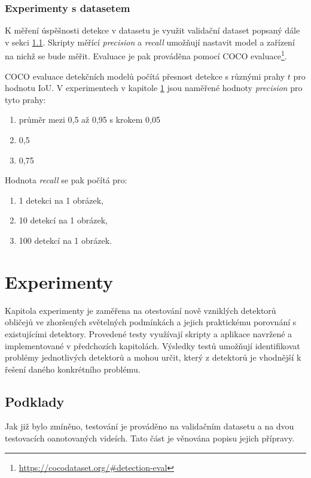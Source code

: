 \subsection*{Experimenty s datasetem}
K měření úspěšnosti detekce v datasetu je využit validační dataset popsaný dále v sekci \ref{sekce:podklady}. Skripty měřící \emph{precision} a \emph{recall} umožňují nastavit model a zařízení na nichž se bude měřit. Evaluace je pak prováděna pomocí COCO evaluace\footnote{\url{https://cocodataset.org/\#detection-eval}}. 

COCO evaluace detekčních modelů počítá přesnost detekce s různými prahy $t$ pro hodnotu IoU. V experimentech v kapitole \ref{kapitola:experimenty} jsou naměřené hodnoty \emph{precision} pro tyto prahy:

\begin{enumerate}
  \item průměr mezi 0,5 až 0,95 s krokem 0,05
  \item 0,5
  \item 0,75
\end{enumerate}

\noindent Hodnota \emph{recall} se pak počítá pro:

\begin{enumerate}
  \item 1 detekci na 1 obrázek,
  \item 10 detekcí na 1 obrázek,
  \item 100 detekcí na 1 obrázek.
\end{enumerate}
 

\chapter{Experimenty}
\label{kapitola:experimenty}
Kapitola experimenty je zaměřena na otestování nově vzniklých detektorů obličejů ve zhoršených světelných podmínkách a jejich praktickému porovnání s existujícími detektory. Provedené testy využívají skripty a aplikace navržené a implementované v předchozích kapitolách. Výsledky testů umožňují identifikovat problémy jednotlivých detektorů a mohou určit, který z detektorů je vhodnější k řešení daného konkrétního problému.

\section{Podklady}
\label{sekce:podklady}
Jak již bylo zmíněno, testování je prováděno na validačním datasetu a na dvou testovacích oanotovaných videích. Tato část je věnována popisu jejich přípravy.

